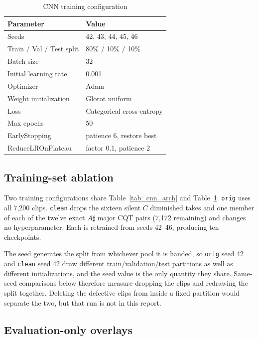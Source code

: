 \documentclass[pdflatex,sn-mathphys-num,iicol]{sn-jnl}
\begin{document}
\begin{table}[t]
\caption{CNN training configuration}\label{tab_cnn_train}
\begin{tabular}{@{}ll@{}}
\toprule
Parameter & Value \\
\midrule
Seeds & 42, 43, 44, 45, 46 \\
Train / Val / Test split & 80\% / 10\% / 10\% \\
Batch size & 32 \\
Initial learning rate & 0.001 \\
Optimizer & Adam \\
Weight initialization & Glorot uniform \\
Loss & Categorical cross-entropy \\
Max epochs & 50 \\
EarlyStopping & patience 6, restore best \\
ReduceLROnPlateau & factor 0.1, patience 2 \\
\bottomrule
\end{tabular}
\end{table}

\subsection{Training-set ablation}\label{subsec_ablation}

Two training configurations share Table~\ref{tab_cnn_arch} and Table~\ref{tab_cnn_train}. \texttt{orig} uses all 7{,}200 clips. \texttt{clean} drops the sixteen silent $C$ diminished takes and one member of each of the twelve exact $A\sharp$ major CQT pairs (7{,}172 remaining) and changes no hyperparameter. Each is retrained from seeds 42--46, producing ten checkpoints.

The seed generates the split from whichever pool it is handed, so \texttt{orig} seed 42 and \texttt{clean} seed 42 draw different train/validation/test partitions as well as different initializations, and the seed value is the only quantity they share. Same-seed comparisons below therefore measure dropping the clips and redrawing the split together. Deleting the defective clips from inside a fixed partition would separate the two, but that run is not in this report.

\subsection{Evaluation-only overlays}\label{subsec_noise}
\end{document}
